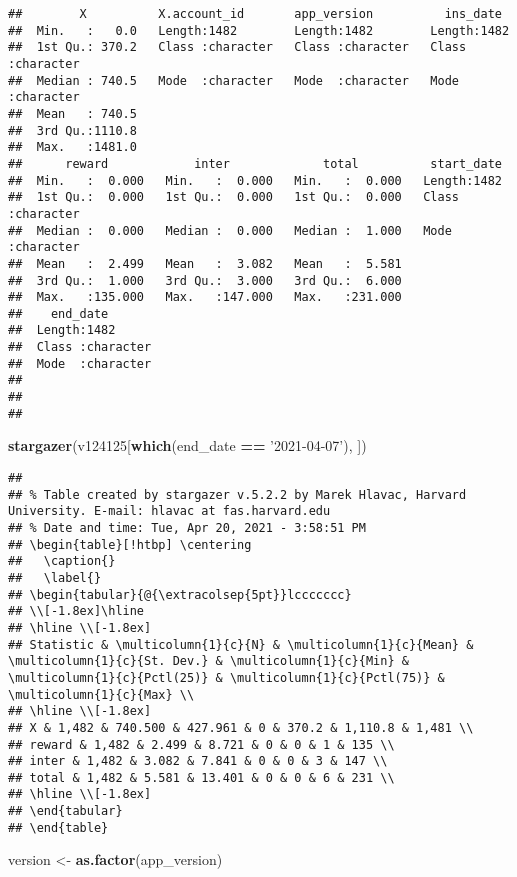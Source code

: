 \documentclass[
]{article}
\newenvironment{Shaded}{\begin{snugshade}}{\end{snugshade}}
\newcommand{\KeywordTok}[1]{\textcolor[rgb]{0.13,0.29,0.53}{\textbf{#1}}}
\newcommand{\NormalTok}[1]{#1}
\newcommand{\OperatorTok}[1]{\textcolor[rgb]{0.81,0.36,0.00}{\textbf{#1}}}
\newcommand{\StringTok}[1]{\textcolor[rgb]{0.31,0.60,0.02}{#1}}
\begin{document}
\begin{verbatim}
##        X          X.account_id       app_version          ins_date        
##  Min.   :   0.0   Length:1482        Length:1482        Length:1482       
##  1st Qu.: 370.2   Class :character   Class :character   Class :character  
##  Median : 740.5   Mode  :character   Mode  :character   Mode  :character  
##  Mean   : 740.5                                                           
##  3rd Qu.:1110.8                                                           
##  Max.   :1481.0                                                           
##      reward            inter             total          start_date       
##  Min.   :  0.000   Min.   :  0.000   Min.   :  0.000   Length:1482       
##  1st Qu.:  0.000   1st Qu.:  0.000   1st Qu.:  0.000   Class :character  
##  Median :  0.000   Median :  0.000   Median :  1.000   Mode  :character  
##  Mean   :  2.499   Mean   :  3.082   Mean   :  5.581                     
##  3rd Qu.:  1.000   3rd Qu.:  3.000   3rd Qu.:  6.000                     
##  Max.   :135.000   Max.   :147.000   Max.   :231.000                     
##    end_date        
##  Length:1482       
##  Class :character  
##  Mode  :character  
##                    
##                    
## 
\end{verbatim}

\begin{Shaded}
\begin{Highlighting}[]
\KeywordTok{stargazer}\NormalTok{(v124125[}\KeywordTok{which}\NormalTok{(end_date }\OperatorTok{==}\StringTok{ '2021-04-07'}\NormalTok{), ])}
\end{Highlighting}
\end{Shaded}

\begin{verbatim}
## 
## % Table created by stargazer v.5.2.2 by Marek Hlavac, Harvard University. E-mail: hlavac at fas.harvard.edu
## % Date and time: Tue, Apr 20, 2021 - 3:58:51 PM
## \begin{table}[!htbp] \centering 
##   \caption{} 
##   \label{} 
## \begin{tabular}{@{\extracolsep{5pt}}lccccccc} 
## \\[-1.8ex]\hline 
## \hline \\[-1.8ex] 
## Statistic & \multicolumn{1}{c}{N} & \multicolumn{1}{c}{Mean} & \multicolumn{1}{c}{St. Dev.} & \multicolumn{1}{c}{Min} & \multicolumn{1}{c}{Pctl(25)} & \multicolumn{1}{c}{Pctl(75)} & \multicolumn{1}{c}{Max} \\ 
## \hline \\[-1.8ex] 
## X & 1,482 & 740.500 & 427.961 & 0 & 370.2 & 1,110.8 & 1,481 \\ 
## reward & 1,482 & 2.499 & 8.721 & 0 & 0 & 1 & 135 \\ 
## inter & 1,482 & 3.082 & 7.841 & 0 & 0 & 3 & 147 \\ 
## total & 1,482 & 5.581 & 13.401 & 0 & 0 & 6 & 231 \\ 
## \hline \\[-1.8ex] 
## \end{tabular} 
## \end{table}
\end{verbatim}

\begin{Shaded}
\begin{Highlighting}[]
\NormalTok{version <-}\StringTok{ }\KeywordTok{as.factor}\NormalTok{(app_version)}
\end{Highlighting}
\end{Shaded}
\end{document}
